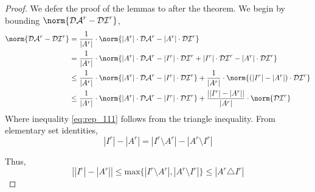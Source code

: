 \begin{proof}

We defer the proof of the lemmas to after the theorem. We begin by bounding $\norm{\mathcal{DA}^r-\mathcal{DI}^{r}}$,
\begin{align}
\norm{\mathcal{DA}^r-\mathcal{DI}^{r}} 
& =\frac{1}{|A^r|} \cdot  \norm{|A^r|\cdot \mathcal{DA}^r-|A^r|\cdot \mathcal{DI}^{r}} \nonumber \\ 
& =\frac{1}{|A^r|} \cdot  \norm{|A^r|\cdot \mathcal{DA}^r-|I^r|\cdot \mathcal{DI}^r+|I^r|\cdot \mathcal{DI}^r-|A^r|\cdot \mathcal{DI}^{r}} \nonumber \\ 
& \leq \frac{1}{|A^r|} \cdot \norm{|A^r|\cdot \mathcal{DA}^r-|I^{r}|\cdot \mathcal{DI}^{r}}+\frac{1}{|A^r|}\cdot \norm{(|I^r|-|A^{r}|)\cdot \mathcal{DI}^{r}} \label{eq:rep_111}\\
& \leq \frac{1}{|A^r|} \cdot \norm{|A^r|\cdot \mathcal{DA}^r-|I^{r}|\cdot \mathcal{DI}^{r}}+\frac{\left ||I^r|-|A^{r}|\right |}{|A^r|}\cdot \norm{\mathcal{DI}^{r}} \label{eq:rep_222}
\end{align}
Where inequality \ref{eq:rep_111} follows from the triangle inequality. 
From elementary set identities, 
\begin{equation}
|I^{r}|-|A^r|=|I^r\setminus A^r|-|A^r\setminus I^r|
\end{equation}

Thus, 
\begin{equation}\label{eq:rep_diff}
\left||I^{r}|-|A^r|\right|\leq \text{max}\{|I^r\setminus A^r|,|A^r\setminus I^r|\}\leq |A^r\triangle I^r|
\end{equation}


\end{proof}
